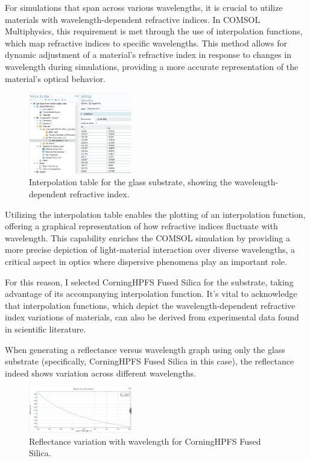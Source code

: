 For simulations that span across various wavelengths, it is crucial to utilize materials with wavelength-dependent refractive indices. In COMSOL Multiphysics, this requirement is met through the use of interpolation functions, which map refractive indices to specific wavelengths. This method allows for dynamic adjustment of a material's refractive index in response to changes in wavelength during simulations, providing a more accurate representation of the material's optical behavior.

\begin{figure}[ht!]
  \centering
  \includegraphics[width=0.4\textwidth]{Chapters/Figures/Chapter 4 Figures/Interpolation Table for Glass Substrate.png}
  \caption{Interpolation table for the glass substrate, showing the wavelength-dependent refractive index.}
  \label{fig:interpolation-table-glass}
\end{figure}

Utilizing the interpolation table enables the plotting of an interpolation function, offering a graphical representation of how refractive indices fluctuate with wavelength. This capability enriches the COMSOL simulation by providing a more precise depiction of light-material interaction over diverse wavelengths, a critical aspect in optics where dispersive phenomena play an important role.

For this reason, I selected Corning\texttrademark \space HPFS\texttrademark {} Fused Silica for the substrate, taking advantage of its accompanying interpolation function. It's vital to acknowledge that interpolation functions, which depict the wavelength-dependent refractive index variations of materials, can also be derived from experimental data found in scientific literature.

When generating a reflectance versus wavelength graph using only the glass substrate (specifically, Corning\texttrademark \space HPFS\texttrademark {} Fused Silica in this case), the reflectance indeed shows variation across different wavelengths.

\begin{figure}[ht!]
  \centering
  \includegraphics[width=0.4\textwidth]{Chapters/Figures/Chapter 4 Figures/Reflectance (Just Glass).png}
  \caption{Reflectance variation with wavelength for Corning\texttrademark \space HPFS\texttrademark {} Fused Silica.}
  \label{fig:Reflectance-variation-glass}
\end{figure}

